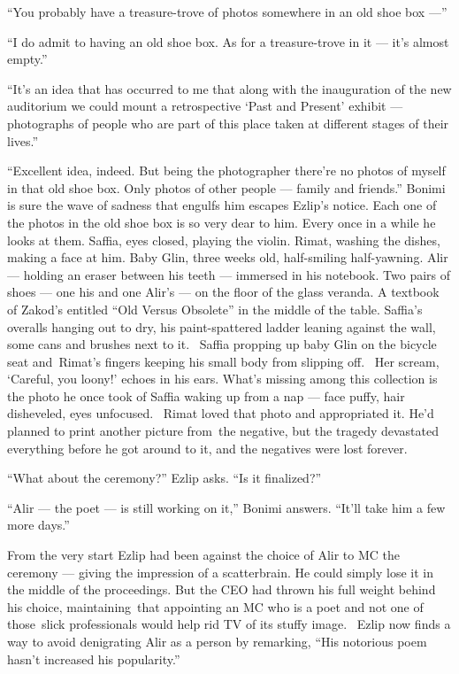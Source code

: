 \documentclass[twoside,11pt]{book}
\begin{document}
``You probably have a treasure-trove of photos somewhere in an old shoe box ---''

``I do admit to having an old shoe box. As for a treasure-trove in it --- it's almost
empty.''

``It's an idea that has occurred to me that along with the inauguration of the new auditorium we could
mount a retrospective `Past and Present' exhibit --- photographs of people who are part of this place taken at
different stages of their lives.''

``Excellent idea, indeed. But being the photographer there're no photos of myself in that old shoe box.
Only photos of other people --- family and friends.'' Bonimi is sure the wave of sadness that engulfs him
escapes Ezlip's notice.  Each one of the photos in the old shoe box is so very dear to him. Every once in a while he
looks at them. Saffia, eyes closed, playing the violin. Rimat, washing the dishes, making a face at him. Baby Glin,
three weeks old, half-smiling half-yawning. Alir --- holding an eraser between his teeth --- immersed in his notebook. Two
pairs of shoes --- one his and one Alir's --- on the floor of the glass veranda. A textbook of Zakod's entitled
``Old Versus Obsolete'' in the middle of the table. Saffia's overalls hanging out to dry, his
paint-spattered ladder leaning against the wall, some cans and brushes next to it. ~Saffia propping up baby Glin on the
bicycle seat and~Rimat's fingers keeping his small body from slipping off. ~Her scream, `Careful, you loony!' echoes in
his ears. What's missing among this collection is the photo he once took of Saffia waking up from a nap --- face puffy,
hair disheveled,{ }{eyes
unfocused.} ~Rimat loved that photo and appropriated it. He'd planned to print another picture from~the negative, but
the tragedy devastated everything before he got around to it, and the negatives were lost forever.

``What about the ceremony?'' Ezlip asks. ``Is it finalized?''

``Alir --- the poet --- is still working on it,'' Bonimi answers. ``It'll take him a
few more days.''

From the very start Ezlip had been against the choice of Alir to MC the ceremony --- giving the impression of a
scatterbrain. He could simply lose it in the middle of the proceedings. But the CEO had thrown his full weight behind
his choice, maintaining~that appointing an MC who is a poet and not one of those~slick professionals would help rid TV
of its stuffy image.{ }~Ezlip now finds a way to avoid denigrating Alir as a person by remarking,
``His notorious poem hasn't increased his popularity.''
\end{document}
